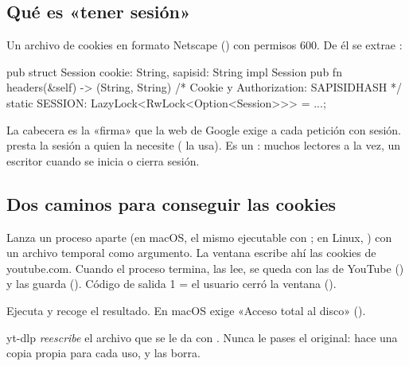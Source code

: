 \subsection{Qué es «tener sesión»}

Un archivo de cookies en formato Netscape () con permisos 600. De él se
extrae :

\begin{rust}
pub struct Session { cookie: String, sapisid: String }
impl Session {
    pub fn headers(&self) -> (String, String) { /* Cookie y Authorization: SAPISIDHASH */ }
}
static SESSION: LazyLock<RwLock<Option<Session>>> = ...;
\end{rust}

La cabecera  es la «firma» que
la web de Google exige a cada petición con sesión.  presta la
sesión a quien la necesite ( la usa). Es un : muchos lectores a la
vez, un escritor cuando se inicia o cierra sesión.

\subsection{Dos caminos para conseguir las cookies}

\begin{description}[style=nextline, leftmargin=0pt]
  \item[Ventana propia (\cod{sign_in_web})] Lanza un proceso aparte (en macOS, el mismo
  ejecutable con ; en Linux, ) con un archivo temporal
  como argumento. La ventana escribe ahí las cookies de youtube.com. Cuando el proceso termina,
   las lee, se queda con las de YouTube () y las guarda
  (). Código de salida 1 = el usuario cerró la ventana ().
  \item[Importar del navegador (\cod{sign_in})] Ejecuta 
  y recoge el resultado. En macOS exige «Acceso total al disco»
  ().
\end{description}

\begin{trampa}
yt-dlp \emph{reescribe} el archivo que se le da con . Nunca le pases el original:
 hace una copia propia para cada uso, y  las
borra.
\end{trampa}

